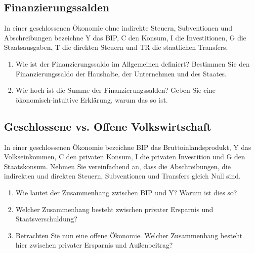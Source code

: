 \documentclass{scrartcl}
\begin{document}
\subsection{Finanzierungssalden}
In einer geschlossenen Ökonomie ohne indirekte Steuern, Subventionen und Abschreibungen bezeichne Y das BIP, C den Konsum, I die Investitionen, G die Staatsausgaben, T die direkten Steuern und TR die staatlichen Transfers.
\begin{enumerate}
	\item Wie ist der Finanzierungssaldo im Allgemeinen definiert? Bestimmen Sie den Finanzierungssaldo der Haushalte, der Unternehmen und des Staates.
	\item Wie hoch ist die Summe der Finanzierungssalden? Geben Sie eine ökonomisch-intuitive Erklärung, warum das so ist.
\end{enumerate}

\subsection{Geschlossene vs. Offene Volkswirtschaft}
In einer geschlossenen Ökonomie bezeichne BIP das Bruttoinlandsprodukt, Y das Volkseinkommen, C den privaten Konsum, I die privaten Investition und G den Staatskonsum. Nehmen Sie vereinfachend an, dass die Abschreibungen, die indirekten und direkten Steuern, Subventionen und Transfers gleich Null sind.
\begin{enumerate}
	\item Wie lautet der Zusammenhang zwischen BIP und Y? Warum ist dies so?
	\item Welcher Zusammenhang besteht zwischen privater Ersparnis und Staatsverschuldung?
	\item Betrachten Sie nun eine offene Ökonomie. Welcher Zusammenhang besteht hier zwischen privater Ersparnis und Außenbeitrag?
\end{enumerate}
\end{document}

